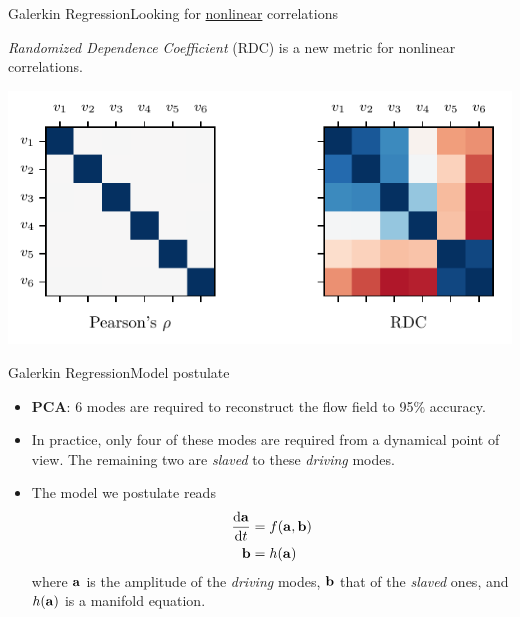 \documentclass[usenames,dvipsnames,svgnames,10pt,aspectratio=169]{beamer}
\begin{document}
\begin{frame}[t, c]{Galerkin Regression}{Looking for \underline{nonlinear} correlations}
	\centering

	\emph{Randomized Dependence Coefficient} (RDC) is a new metric for nonlinear correlations.

	\bigskip

	\includegraphics[width=.66\textwidth]{linear_vs_nonlinear_correlations}

\end{frame}

\begin{frame}[t, c]{Galerkin Regression}{Model postulate}
	\begin{itemize}
		\item \textbf{\alert{PCA}}: 6 modes are required to reconstruct the flow field to 95\% accuracy.
		\bigskip
		\item In practice, only four of these modes are required from a dynamical point of view. The remaining two are \emph{slaved} to these \emph{driving} modes.
		\bigskip
		\item The model we postulate reads
		\begin{equation}
			\begin{aligned}
				\displaystyle \frac{\mathrm{d}{\bf a}}{\mathrm{d}t} & = f({\bf a}, {\bf b})\\
				{\bf b} & = h({\bf a})
			\end{aligned}
			\notag
		\end{equation}
		where ${\bf a}$ is the amplitude of the \emph{driving} modes, ${\bf b}$ that of the \emph{slaved} ones, and $h({\bf a})$ is a manifold equation.
	\end{itemize}
	\vspace{1cm}
\end{frame}
\end{document}
